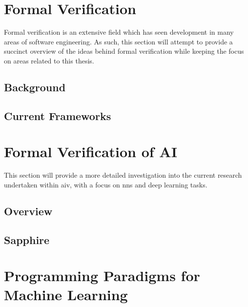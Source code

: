 \section{Formal Verification}

Formal verification is an extensive field which has seen development in many areas 
of software engineering. As such, this section will attempt to provide a succinct 
overview of the ideas behind formal verification while keeping the focus on areas
related to this thesis.

\subsection{Background}


\subsection{Current Frameworks}


\section{Formal Verification of AI}

This section will provide a more detailed investigation into the current research
undertaken within \gls{aiv}, with a focus on \glspl{nn} and deep learning tasks.

\subsection{Overview}

\subsection{Sapphire}


\section{Programming Paradigms for Machine Learning}

